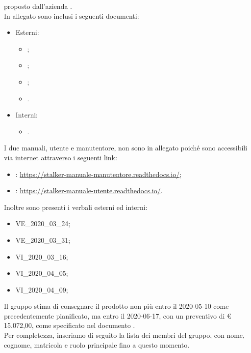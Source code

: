 \documentclass[12pt,a4paper]{letter}
\begin{document}
\begin{letter}
        proposto dall'azienda \textbf{\Proponente{}}.\\
        In allegato sono inclusi i seguenti documenti:
        \begin{itemize}
            \item Esterni:
            \begin{itemize}
                \item {};
                \item {};
                \item {};
                \item {}.
            \end{itemize}
            \item Interni:
            \begin{itemize}
                \item {}.
            \end{itemize}
        \end{itemize}
        I due manuali, utente e manutentore, non sono in allegato poiché sono accessibili via internet attraverso i seguenti link:
        \begin{itemize}
            \item {}: \href{https://stalker-manuale-manutentore.readthedocs.io/}{https://stalker-manuale-manutentore.readthedocs.io/};
            \item {}: \href{https://stalker-manuale-utente.readthedocs.io/}{https://stalker-manuale-utente.readthedocs.io/}.
        \end{itemize}
        Inoltre sono presenti i verbali esterni ed interni:
        \begin{itemize}
            \item VE\_2020\_03\_24;
            \item VE\_2020\_03\_31;
            \item VI\_2020\_03\_16;
            \item VI\_2020\_04\_05;
            \item VI\_2020\_04\_09;
        \end{itemize}
        Il gruppo stima di consegnare il prodotto non più entro il 2020-05-10 come precedentemente pianificato, ma entro il 2020-06-17, con un preventivo di \euro{} 15.072,00, come specificato nel documento \PdP{}.\\
        Per completezza, inseriamo di seguito la lista dei membri del gruppo, con nome, cognome, matricola e ruolo principale fino a questo momento.

\end{letter}
\end{document}
